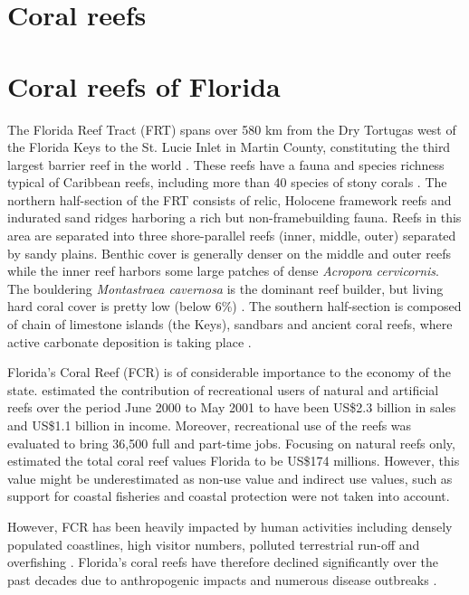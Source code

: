 \documentclass[12pt ,a4paper]{article}
\begin{document}
\section{Coral reefs}

\section{Coral reefs of Florida}

The Florida Reef Tract (FRT) spans over 580 km from the Dry Tortugas west of the Florida Keys to the St. Lucie Inlet in Martin County, constituting the third largest barrier reef in the world \citep{finkl2008shelf}. These reefs have a fauna and species richness typical of Caribbean reefs, including more than 40 species of stony corals \citep{banks2008reef,jackson2014status}. The northern half-section of the FRT consists of relic, Holocene framework reefs and indurated sand ridges harboring a rich but non-framebuilding fauna. Reefs in this area are separated into three shore-parallel reefs (inner, middle, outer) separated by sandy plains. Benthic cover is generally denser on the middle and outer reefs while the inner reef harbors some large patches of dense \textit{Acropora cervicornis}. The bouldering \textit{Montastraea cavernosa} is the dominant reef builder, but living hard coral cover is pretty low (below 6\%) \citep{banks2008reef}. The southern half-section is composed of chain of limestone islands (the Keys), sandbars and ancient coral reefs, where active carbonate deposition is taking place \citep{hoffmeister1968geology}.

Florida's Coral Reef (FCR) is of considerable importance to the economy of the state. \cite{johns2003socio} estimated the contribution of recreational users of natural and artificial reefs over the period June 2000 to May 2001 to have been US\$2.3 billion in sales and US\$1.1 billion in income. Moreover, recreational use of the reefs was evaluated to bring 36,500 full and part-time jobs. Focusing on natural reefs only, \cite{brander2013total} estimated the total coral reef values Florida to be US\$174 millions. However, this value might be underestimated as non-use value and indirect use values, such as support for coastal fisheries and coastal protection were not taken into account.

However, FCR has been heavily impacted by human activities including densely populated coastlines, high visitor numbers, polluted terrestrial run-off and overfishing \citep{jackson2014status}. Florida’s coral reefs have therefore declined significantly over the past decades due to anthropogenic impacts and numerous disease outbreaks \citep{jackson2014status}.
\end{document}
